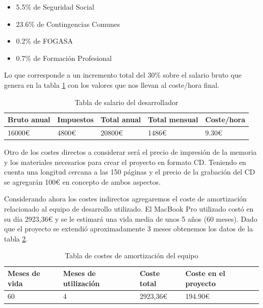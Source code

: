 \begin{itemize}
	\item 5.5\% de Seguridad Social
	\item 23.6\% de Contingencias Comunes
	\item 0.2\% de FOGASA
	\item 0.7\% de Formación Profesional
\end{itemize}

Lo que corresponde a un incremento total del 30\% sobre el salario bruto que genera en la tabla \ref{tab:salario} con los valores que nos llevan al coste/hora final.

\begin{table}
		\begin{tabular}{|l|l|l|l|l|}
			\hline
			\textbf{Bruto anual} & \textbf{Impuestos} & \textbf{Total anual} & \textbf{Total mensual} & \textbf{Coste/hora} \\
			
			\hline
			16000\euro{}& 4800\euro{} & 20800\euro{} & 1486\euro{} & 9.30\euro{} \\
			
			\hline
		\end{tabular}
		\caption{Tabla de salario del desarrollador}
		\label{tab:salario}
\end{table}

\bigskip

Otro de los costes directos a considerar será el precio de impresión de la memoria y los materiales necesarios para crear el proyecto en formato CD. Teniendo en cuenta una longitud cercana a las 150 páginas y el precio de la grabación del CD se agregarán 100\euro{} en concepto de ambos aspectos.

\bigskip

Considerando ahora los costes indirectos agregaremos el coste de amortización relacionado al equipo de desarrollo utilizado. El MacBook Pro utilizado costó en su día 2923,36\euro{} y se le estimará una vida media de unos 5 años (60 meses). Dado que el proyecto se extendió aproximadamente 3 meses obtenemos los datos de la tabla \ref{tab:mac}.

\begin{table}
	\begin{tabular}{|l|l|l|l|}
		\hline
		\textbf{Meses de vida} & \textbf{Meses de utilización} & \textbf{Coste total} & \textbf{Coste en el proyecto}\\
		
		\hline
		60{}& 4{} & 2923,36\euro{} & 194.90\euro{} \\
		
		\hline
	\end{tabular}
	\caption{Tabla de costes de amortización del equipo}
	\label{tab:mac}
\end{table}

